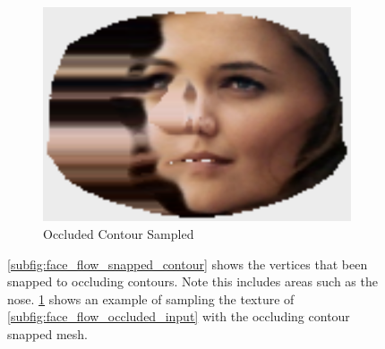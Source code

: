 \begin{figure}[t]
    \begin{subfigure}[b]{0.4\textwidth}
        \centering
        \includegraphics[width=\textwidth]{face_flow/images/contour_snapping/sampled_snapping}
        \caption{Occluded Contour Sampled}\label{subfig:face_flow_snapped_sampling}
    \end{subfigure}
    \hspace*{\fill}
    \caption{\cref{subfig:face_flow_snapped_contour} shows the vertices that
             been snapped to occluding contours. Note this includes areas such
             as the nose. \cref{subfig:face_flow_snapped_sampling} shows an
             example of sampling the texture of
             \cref{subfig:face_flow_occluded_input} with the occluding contour
             snapped mesh.}
\label{fig:face_flow_snapping_example}
\end{figure}
